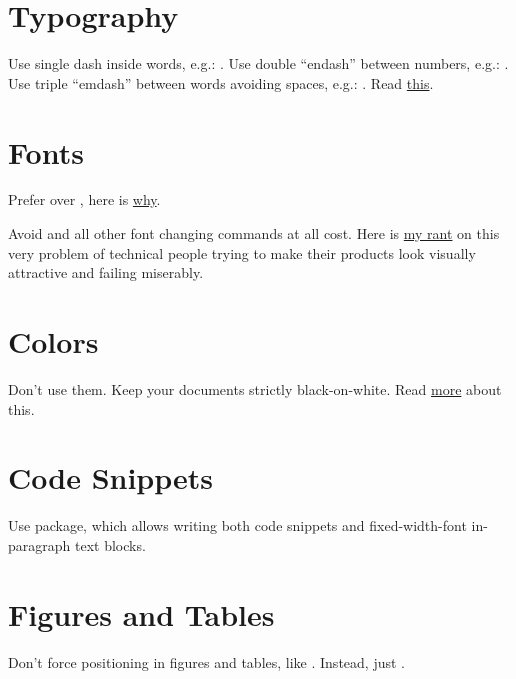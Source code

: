 \documentclass[12pt,nonacm,natbib=false]{acmart}
\begin{document}
\section{Typography}

Use single dash inside words, e.g.: .
Use double ``endash'' between numbers, e.g.: .
Use triple ``emdash'' between words avoiding spaces, e.g.: .
Read \href{https://tex.stackexchange.com/questions/3819/dashes-vs-vs}{this}.

\section{Fonts}

Prefer  over , here is \href{https://tex.stackexchange.com/a/1983/1449}{why}.

Avoid  and all other font changing commands at all cost. Here is \href{https://www.yegor256.com/2019/05/21/dont-improvise.html}{my rant} on this very problem of technical people trying to make their products look visually attractive and failing miserably.

\section{Colors}

Don't use them. Keep your documents strictly black-on-white. Read \href{https://academia.stackexchange.com/questions/13616/are-there-good-reasons-to-avoid-using-color-in-research-papers}{more} about this.

\section{Code Snippets}

Use \href{https://ctan.org/pkg/ffcode}{} package, which allows writing both code snippets and fixed-width-font in-paragraph text blocks.

\section{Figures and Tables}

Don't force positioning in figures and tables, like . Instead, just .
\end{document}
